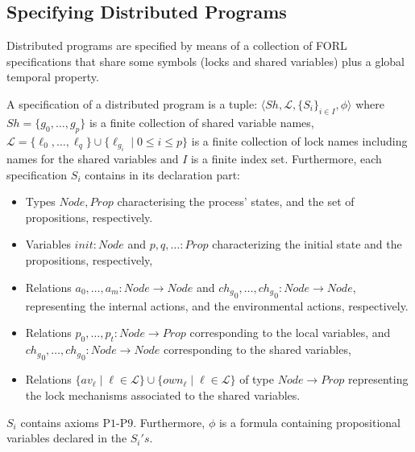\subsection{Specifying Distributed Programs} 
	Distributed programs are specified by means of a  collection of \textsf{FORL} specifications that share  some symbols (locks and shared variables) plus a global temporal property.
\begin{definition} A specification of a distributed program is a tuple: $\langle Sh, \mathcal{L}, \{ S_i \}_{i \in I}, \phi \rangle$ where $Sh=\{g_0,\dots, g_p\}$ is a finite collection
of shared variable names, $\mathcal{L} =\{\ell_0,\dots,\ell_q\}\cup \{\ell_{g_i} \mid 0 \leq i \leq p \}$ is a finite collection of lock names including names for the shared variables and $I$ is a finite index set. Furthermore, each specification $S_i$ contains in its declaration part:
\begin{itemize}
	\item Types $\mathit{Node}, \textit{Prop}$ characterising the process' states, and the set of propositions, respectively.
	\item Variables $\mathit{init}{:}\mathit{Node}$ and $p,q,\dots{:}Prop$ characterizing the initial state and the propositions, respectively,
	\item Relations  $a_0, \dots, a_m{:} \mathit{Node} \rightarrow \mathit{Node}$ and  ${\mathit{ch}_g}_0, \dots, {\mathit{ch}_g}_0{:} \mathit{Node} \rightarrow \mathit{Node}$, representing the 
	internal actions, and the environmental actions, respectively.
	\item Relations  $p_0,\dots,p_t{:}\mathit{Node} \rightarrow \mathit{Prop}$  corresponding to the local variables, and ${\mathit{ch}_g}_0, \dots, {\mathit{ch}_g}_0{:} \mathit{Node} \rightarrow \mathit{Node}$ corresponding to the shared variables,
	\item Relations $\{\mathit{av}_\ell \mid \ell \in \mathcal{L}\} \cup \{\mathit{own}_\ell \mid \ell \in \mathcal{L}\}$ of type $\mathit{Node} \rightarrow \mathit{Prop}$  representing the lock mechanisms associated to the shared variables. 
 \end{itemize}
	$S_i$ contains axioms $\text{P1}$-$\text{P9}$.
Furthermore, $\phi$ is a {\LTLX} formula  containing propositional variables declared in the $S_i's$.
\end{definition}
